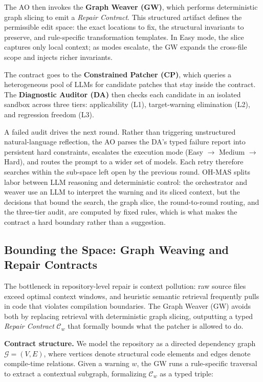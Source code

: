 \documentclass[10pt,conference]{IEEEtran}
\begin{document}
The AO then invokes the \textbf{Graph Weaver (GW)}, which performs deterministic graph slicing to emit a \emph{Repair Contract}. This structured artifact defines the permissible edit space: the exact locations to fix, the structural invariants to preserve, and rule-specific transformation templates. In Easy mode, the slice captures only local context; as modes escalate, the GW expands the cross-file scope and injects richer invariants.

The contract goes to the \textbf{Constrained Patcher (CP)}, which queries a heterogeneous pool of LLMs for candidate patches that stay inside the contract. The \textbf{Diagnostic Auditor (DA)} then checks each candidate in an isolated sandbox across three tiers: applicability (L1), target-warning elimination (L2), and regression freedom (L3).

A failed audit drives the next round. Rather than triggering unstructured natural-language reflection, the AO parses the DA's typed failure report into persistent hard constraints, escalates the execution mode (Easy $\rightarrow$ Medium $\rightarrow$ Hard), and routes the prompt to a wider set of models. Each retry therefore searches within the sub-space left open by the previous round. OH-MAS splits labor between LLM reasoning and deterministic control: the orchestrator and weaver use an LLM to interpret the warning and its sliced context, but the decisions that bound the search, the graph slice, the round-to-round routing, and the three-tier audit, are computed by fixed rules, which is what makes the contract a hard boundary rather than a suggestion.

\subsection{Bounding the Space: Graph Weaving and Repair Contracts}
\label{sec:app_gw}

The bottleneck in repository-level repair is context pollution: raw source files exceed optimal context windows, and heuristic semantic retrieval frequently pulls in code that violates compilation boundaries. The Graph Weaver (GW) avoids both by replacing retrieval with deterministic graph slicing, outputting a typed \emph{Repair Contract} $\mathcal{C}_w$ that formally bounds what the patcher is allowed to do.

\textbf{Contract structure.} We model the repository as a directed dependency graph $\mathcal{G} = (V, E)$, where vertices denote structural code elements and edges denote compile-time relations. Given a warning $w$, the GW runs a rule-specific traversal to extract a contextual subgraph, formalizing $\mathcal{C}_w$ as a typed triple:
\end{document}

